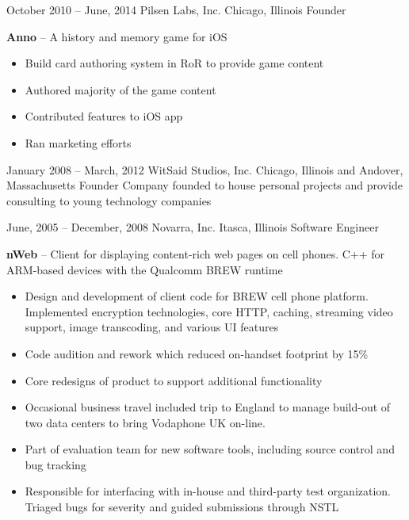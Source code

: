 \documentclass[]{friggeri-cv}
\begin{document}
\begin{entrylist}
    \entryalt
    {October 2010 -- June, 2014}
    {Pilsen Labs, Inc.}
    {Chicago, Illinois}
    {Founder}
    {\textbf{Anno} -- A history and memory game for iOS
    \begin{itemize}
      \item Build card authoring system in RoR to provide game content
      \item Authored majority of the game content
      \item Contributed features to iOS app
      \item Ran marketing efforts
    \end{itemize}}

    \entryalt
    {January 2008 -- March, 2012}
    {WitSaid Studios, Inc.}
    {Chicago, Illinois and Andover, Massachusetts}
    {Founder}
    {Company founded to house personal projects and provide consulting to young technology companies}

    \entryalt
    {June, 2005 -- December, 2008}
    {Novarra, Inc.}
    {Itasca, Illinois}
    {Software Engineer}
    {\textbf{nWeb} -- Client for displaying content-rich web pages on cell phones. C++ for ARM-based devices with the Qualcomm BREW runtime
    \begin{itemize}
      \item Design and development of client code for BREW cell phone platform. Implemented encryption technologies, core HTTP, caching, streaming video support, image transcoding, and various UI features
      \item Code audition and rework which reduced on-handset footprint by 15\%
      \item Core redesigns of product to support additional functionality
      \item Occasional business travel included trip to England to manage build-out of two data centers to bring Vodaphone UK on-line.
      \item Part of evaluation team for new software tools, including source control and bug tracking
      \item Responsible for interfacing with in-house and third-party test organization. Triaged bugs for severity and guided submissions through NSTL
     \end{itemize}}
     

\end{entrylist}
\end{document}
